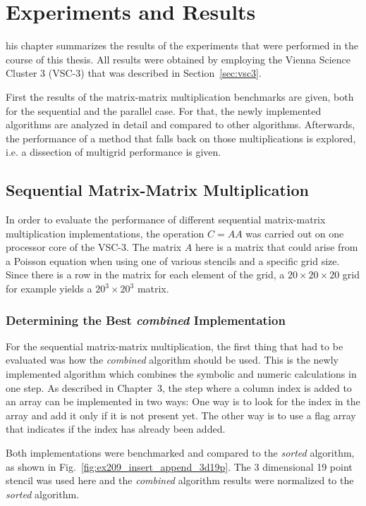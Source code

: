 \chapter{Experiments and Results}
his chapter summarizes the results of the experiments that were performed in the course of this thesis. All results were obtained by employing the Vienna Science Cluster 3 (VSC-3) that was described in Section~\ref{sec:vsc3}. 

First the results of the matrix-matrix multiplication benchmarks are given, both for the sequential and the parallel case. For that, the newly implemented algorithms are analyzed in detail and compared to other algorithms. Afterwards, the performance of a method that falls back on those multiplications is explored, i.e. a dissection of multigrid performance is given.

\section{Sequential Matrix-Matrix Multiplication}

In order to evaluate the performance of different sequential matrix-matrix multiplication implementations, the operation $C = AA$ was carried out on one processor core of the VSC-3. The matrix $A$ here is a matrix that could arise from a Poisson equation when using one of various stencils and a specific grid size. Since there is a row in the matrix for each element of the grid, a $20\times 20 \times 20$ grid for example yields a $20^3 \times 20^3$ matrix.

\subsection{Determining the Best \textit{combined} Implementation}
For the sequential matrix-matrix multiplication, the first thing that had to be evaluated was how the \textit{combined} algorithm should be used. This is the newly implemented algorithm which combines the symbolic and numeric calculations in one step. As described in Chapter~3, the step where a column index is added to an array can be implemented in two ways: One way is to look for the index in the array and add it only if it is not present yet. The other way is to use a flag array that indicates if the index has already been added. 

Both implementations were benchmarked and compared to the \textit{sorted} algorithm, as shown in Fig.~\ref{fig:ex209_insert_append_3d19p}. The 3 dimensional 19 point stencil was used here and the \textit{combined} algorithm results were normalized to the \textit{sorted} algorithm. 


